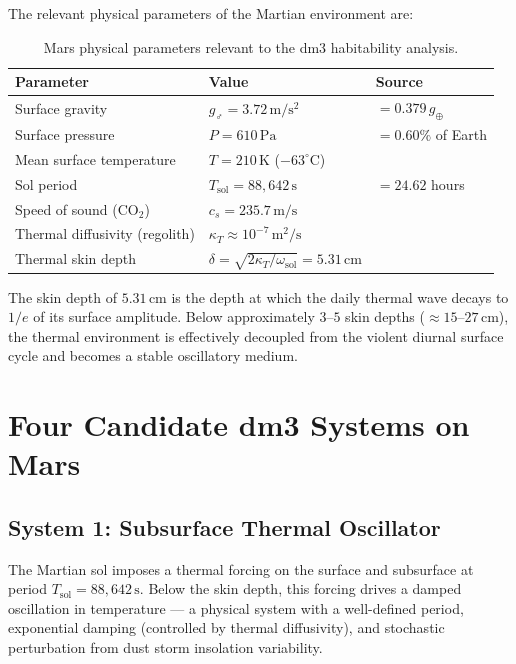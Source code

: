 The relevant physical parameters of the Martian environment are:

\begin{table}[h]
\centering
\small
\begin{tabular}{lll}
\toprule
\textbf{Parameter} & \textbf{Value} & \textbf{Source} \\
\midrule
Surface gravity & $g_\Mars = 3.72\,\mathrm{m/s^2}$
  & $= 0.379\,g_\oplus$ \\
Surface pressure & $P = 610\,\mathrm{Pa}$
  & $= 0.60\%$ of Earth \\
Mean surface temperature & $T = 210\,\mathrm{K}$ ($-63^\circ$C) & \\
Sol period & $T_{\text{sol}} = 88{,}642\,\mathrm{s}$ & $= 24.62$ hours \\
Speed of sound (CO$_2$) & $c_s = 235.7\,\mathrm{m/s}$ & \\
Thermal diffusivity (regolith) & $\kappa_T \approx 10^{-7}\,\mathrm{m^2/s}$ & \\
Thermal skin depth & $\delta = \sqrt{2\kappa_T/\omega_{\text{sol}}}
  = 5.31\,\mathrm{cm}$ & \\
\bottomrule
\end{tabular}
\caption{Mars physical parameters relevant to the dm3 habitability analysis.}
\label{tab:mars-params}
\end{table}

The skin depth of $5.31\,\mathrm{cm}$ is the depth at which the
daily thermal wave decays to $1/e$ of its surface amplitude. Below
approximately $3$--$5$ skin depths ($\approx 15$--$27\,\mathrm{cm}$),
the thermal environment is effectively decoupled from the violent
diurnal surface cycle and becomes a stable oscillatory medium.

\section{Four Candidate dm3 Systems on Mars}
\label{sec:mars-candidates}

\subsection{System 1: Subsurface Thermal Oscillator}

The Martian sol imposes a thermal forcing on the surface and subsurface
at period $T_{\text{sol}} = 88{,}642\,\mathrm{s}$. Below the skin depth,
this forcing drives a damped oscillation in temperature --- a physical
system with a well-defined period, exponential damping (controlled by
thermal diffusivity), and stochastic perturbation from dust storm
insolation variability.


